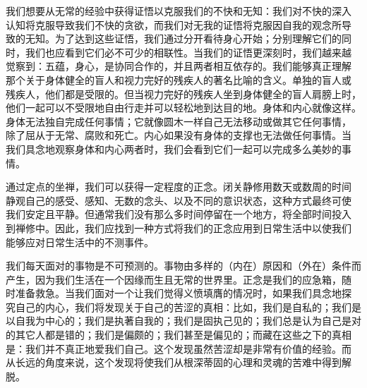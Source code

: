 我们想要从无常的经验中获得证悟以克服我们的不快和无知：我们对不快的深入
认知将克服导致我们不快的贪欲，而我们对无我的证悟将克服因自我的观念所导
致的无知。为了达到这些证悟，我们通过分开看待身心开始；分别理解它们的同
时，我们也应看到它们必不可少的相联性。当我们的证悟更深刻时，我们越来越
觉察到：五蕴，身心，是协同合作的，并且\1两者相互依存的。我们能够真正理解
那个关于身体健全的盲人和视力完好的残疾人的著名比喻的含义。单独的盲人或
残疾人，他们都是受限的。但当视力完好的残疾人坐到身体健全的盲人肩膀上时，
他们一起可以不受限地自由行走并可以轻松地到达目的地。身体和内心就像这样。
身体无法独自完成任何事情；它就像圆木一样自己无法移动或做其它任何事情，
除了屈从于无常、腐败和死亡。内心如果没有身体的支撑也无法做任何事情。当
我们具念地观察身体和内心两者时，我们会看到它们一起可以完成多么美妙的事
情。

通过定点的坐禅，我们可以获得一定程度的正念。闭关静修用数天或数周的时间
静观自己的感受、感知、无数的念头、以及不同的意识状态，这种方式最终可使
我们安定且平静。但通常我们没有那么多时间停留在一个地方，将全部时间投入
到禅修中。因此，我们应找到一种方式将我们的正念应用到日常生活中以使我们
能够应对日常生活中的不测事件。

我们每天面对的事物是不可预测的。事物由多样的（内在）原因和（外在）条件而
产生，因为我们生活在一个因缘而生且无常的世界里。正念是我们的应急箱，随
时准备救急。当我们面对一个让我们觉得义愤填膺的情况时，如果我们具念地探
究自己的内心，我们将发现关于自己的苦涩的真相：比如，我们是自私的；我们是
以自我为中心的；我们是执著自我的；我们是固执己见的；我们总是认为自己是对
的其它人都是错的；我们是偏颇的；我们甚至是偏见的；而藏在这些之下的真相
是：我们并不真正地爱我们自己。这个发现虽然苦涩却是非常有价值的经验。而
从长远的角度来说，这个发现将使我们从根深蒂固的心理和灵魂的苦难中得到解
脱。

\endchapter

\byebye
